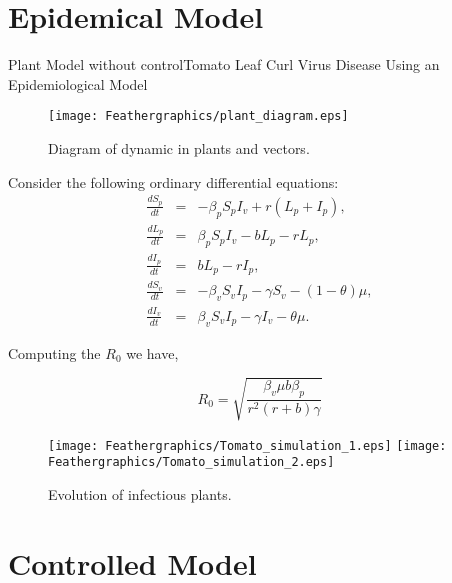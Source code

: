 \documentclass[10pt]{beamer}
\begin{document}
\section{Epidemical Model}
\begin{frame}{Plant Model without control}{Tomato Leaf Curl Virus Disease Using an Epidemiological Model}
\begin{figure}
  \centering
    \texttt{[image: Feathergraphics/plant\_diagram.eps]}
  \caption{Diagram of dynamic in plants and vectors.}
\end{figure}
\end{frame}

\begin{frame}	
	Consider the following ordinary differential equations:
		\begin{eqnarray}
            \frac{dS_p}{dt} &=&-\beta_p S_p I_v +r (L_p +  I_p),\nonumber\\
            \frac{dL_p}{dt} &=& \beta_p S_p I_v -b L_p -r L_p,\nonumber\\
            \frac{dI_p}{dt} &=& b L_p - r I_p,\\
            \frac{dS_v}{dt} &=&-\beta_v S_v I_p - \gamma S_v -(1-\theta)\mu,\nonumber\\
            \frac{dI_v}{dt} &=&  \beta_v S_v I_p -\gamma I_v -\theta\mu\nonumber.
		\end{eqnarray}					
\end{frame}

\begin{frame}
Computing the $R_0$ we have,

	$$R_0=\sqrt{\frac{\beta_v\mu b\beta_p}{r^2(r+b)\gamma}}$$


\begin{figure}
	\centering	
	\texttt{[image: Feathergraphics/Tomato\_simulation\_1.eps]}
	\texttt{[image: Feathergraphics/Tomato\_simulation\_2.eps]}
	\caption{Evolution of infectious plants.}
\end{figure}	
\end{frame}

\section{Controlled Model}
\end{document}
